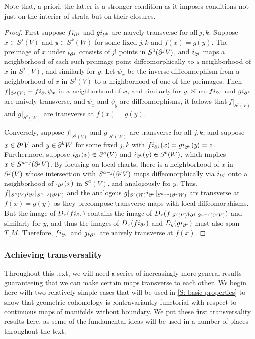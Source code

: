 Note that, a priori, the latter is a stronger condition as it imposes conditions not just on the interior of strata but on their closures.

\begin{proof}
	First suppose $fi_{\partial^j}$ and $gi_{\partial^k}$ are naively transverse for all $j,k$.
	Suppose $x \in S^j(V)$ and $y \in S^k(W)$ for some fixed $j,k$ and $f(x) = g(y)$.
	The preimage of $x$ under $i_{\partial^j}$ consists of $j!$ points in $S^0(\partial^jV)$, and $i_{\partial^j}$ maps a neighborhood of each such preimage point diffeomorphically to a neighborhood of $x$ in $S^j(V)$, and similarly for $y$.
	Let $\psi_x$ be the inverse diffeomorphism from a neighborhood of $x$ in $S^j(V)$ to a neighborhood of one of the preimages.
	Then $f|_{S^j(V)} = fi_{\partial^j}\psi_x$ in a neighborhood of $x$, and similarly for $y$.
	Since $fi_{\partial^j}$ and $gi_{\partial^k}$ are naively transverse, and $\psi_x$ and $\psi_y$ are diffeomorphisms, it follows that $f|_{S^j(V)}$ and $g|_{S^k(W)}$ are transverse at $f(x) = g(y)$.

	Conversely, suppose $f|_{S^j(V)}$ and $g|_{S^k(W)}$ are transverse for all $j,k$, and suppose $x \in \partial^jV$ and $y \in \partial^kW$ for some fixed $j,k$ with $fi_{\partial^j}(x) = gi_{\partial^k}(y) = z$.
	Furthermore, suppose $i_{\partial^j}(x) \in S^a(V)$ and $i_{\partial^k}(y) \in S^b(W)$, which implies $x \in S^{a-j}(\partial^j V)$.
	By focusing on local charts, there is a neighborhood of $x$ in $\partial^j(V)$ whose intersection with $S^{a-j}(\partial^j V)$ maps diffeomorphically via $i_{\partial^j}$ onto a neighborhood of $i_{\partial^j}(x)$ in $S^a(V)$, and analogously for $y$.
	Thus, $f|_{S^a(V)}i_{\partial^j}|_{S^{a-j}(\partial^j V)}$ and the analogous $g|_{S^b(W)}i_{\partial^k}|_{S^{b-k}(\partial^k W)}$ are transverse at $f(x) = g(y)$ as they precompose transverse maps with local diffeomorphisms.
	But the image of $D_x(fi_{\partial^j})$ contains the image of $D_x(f|_{S^j(V)}i_{\partial^j}|_{S^{a-j}(\partial^j V)})$ and similarly for $y$, and thus the images of $D_x(fi_{\partial^j})$ and $D_y(gi_{\partial^k})$ must also span $T_{z}M$.
	Therefore, $fi_{\partial^j}$ and $gi_{\partial^k}$ are naively transverse at $f(x)$.
\end{proof}

\subsubsection{Achieving transversality}

Throughout this text, we will need a series of increasingly more general results guaranteeing that we can make certain maps transverse to each other.
We begin here with two relatively simple cases that will be used in \cref{S: basic properties} to show that geometric cohomology is contravariantly functorial with respect to continuous maps of manifolds without boundary.
We put these first transversality results here, as some of the fundamental ideas will be used in a number of places throughout the text.

